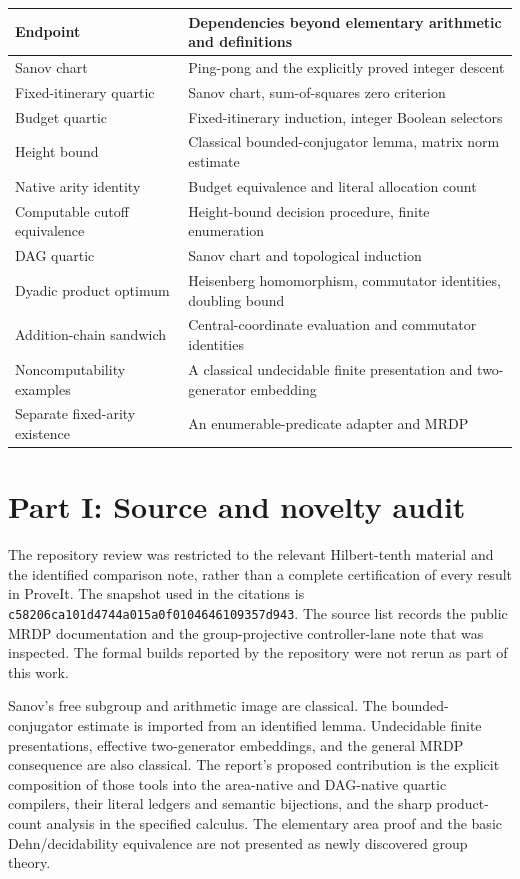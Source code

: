 \documentclass[11pt,letterpaper]{article}
\theoremstyle{definition}
\theoremstyle{remark}
\newcommand{\sha}{\texttt{c58206ca101d4744a015a0f0104646109357d943}}
\begin{document}
\begin{center}
\begin{tabular}{L{0.29\textwidth}L{0.57\textwidth}}
\toprule
Endpoint & Dependencies beyond elementary arithmetic and definitions\\
\midrule
Sanov chart & Ping-pong and the explicitly proved integer descent\\
Fixed-itinerary quartic & Sanov chart, sum-of-squares zero criterion\\
Budget quartic & Fixed-itinerary induction, integer Boolean selectors\\
Height bound & Classical bounded-conjugator lemma, matrix norm estimate\\
Native arity identity & Budget equivalence and literal allocation count\\
Computable cutoff equivalence & Height-bound decision procedure, finite enumeration\\
DAG quartic & Sanov chart and topological induction\\
Dyadic product optimum & Heisenberg homomorphism, commutator identities, doubling bound\\
Addition-chain sandwich & Central-coordinate evaluation and commutator identities\\
Noncomputability examples & A classical undecidable finite presentation and two-generator embedding\\
Separate fixed-arity existence & An enumerable-predicate adapter and MRDP\\
\bottomrule
\end{tabular}
\end{center}

\section{Part I: Source and novelty audit}\label{gts:vk:app:audit}

The repository review was restricted to the relevant Hilbert-tenth material and the identified comparison note, rather than a complete certification of every result in ProveIt. The snapshot used in the citations is \sha. The source list records the public MRDP documentation and the group-projective controller-lane note that was inspected. The formal builds reported by the repository were not rerun as part of this work.

Sanov's free subgroup and arithmetic image are classical. The bounded-conjugator estimate is imported from an identified lemma. Undecidable finite presentations, effective two-generator embeddings, and the general MRDP consequence are also classical. The report's proposed contribution is the explicit composition of those tools into the area-native and DAG-native quartic compilers, their literal ledgers and semantic bijections, and the sharp product-count analysis in the specified calculus. The elementary area proof and the basic Dehn/decidability equivalence are not presented as newly discovered group theory.
\end{document}
